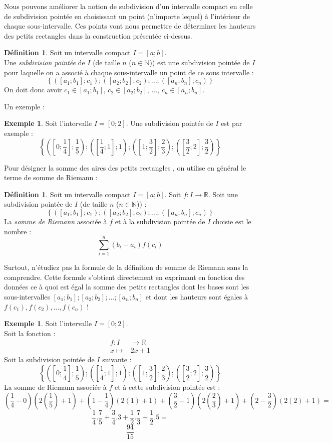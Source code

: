 \documentclass[a4paper,fontsize=13pt]{scrreprt}
\theoremstyle{plain}
\theoremstyle{definition}
\newtheorem{déf}[subsection]{Définition}
\newtheorem{exe}[subsection]{Exemple}
\newcommand{\nn}{\mathbb{N}}
\newcommand{\rr}{\mathbb{R}}
\begin{document}
Nous pouvons améliorer la notion de subdivision d'un intervalle compact en celle de subdivision pointée en choisissant un point (n'importe lequel) à l'intérieur de chaque sous-intervalle. Ces points vont nous permettre de déterminer les hauteurs des petits rectangles dans la construction présentée ci-dessus.
\begin{déf}
Soit un intervalle compact $I = [a;b]$. \\
Une \emph{subdivision pointée} de $I$ (de taille $n$ ($n \in \nn$)) est une subdivision pointée de $I$ pour laquelle on a associé à chaque sous-intervalle un point de ce sous intervalle :
$$\left\{([a_1;b_1];c_1);([a_2;b_2];c_2);...;([a_n;b_n];c_n)\right\}$$
On doit donc avoir $c_1 \in [a_1;b_1]$, $c_2 \in [a_2;b_2]$, ..., $c_n \in [a_n;b_n]$.
\end{déf}
Un exemple :
\begin{exe}
Soit l'intervalle $I = [0;2]$. Une subdivision pointée de $I$ est par exemple :
$$\left\{([0;\frac{1}{4}];\frac{1}{5});([\frac{1}{4};1];1);([1;\frac{3}{2}];\frac{2}{3});([\frac{3}{2};2];\frac{3}{2})\right\}$$
\end{exe}
Pour désigner \og la somme des aires des petits rectangles \fg, on utilise en général le terme de somme de Riemann :
\begin{déf}
Soit un intervalle compact $I = [a;b]$. Soit $f : I \to \rr$. Soit une subdivision pointée de $I$ (de taille $n$ ($n \in \nn$)) :
$$\left\{([a_1;b_1];c_1);([a_2;b_2];c_2);...;([a_n;b_n];c_n)\right\}$$
La \emph{somme de Riemann} associée à $f$ et à la subdivision pointée de $I$ choisie est le nombre :
$$\sum\limits_{i=1}^{n} (b_i - a_i) f(c_i)$$
\end{déf}
Surtout, n'étudiez pas la formule de la définition de somme de Riemann sans la comprendre. Cette formule s'obtient directement en exprimant en fonction des données ce à quoi est égal la somme des petits rectangles dont les bases sont les sous-intervalles $[a_1;b_1];[a_2;b_2];...;[a_n;b_n]$ et dont les hauteurs sont égales à $f(c_1), f(c_2),...,f(c_n)$ !
\begin{exe}
Soit l'intervalle $I = [0;2]$. \\
Soit la fonction :
\begin{align*}
f : I &\to \rr \\
x \mapsto & 2x+1
\end{align*}
Soit la subdivision pointée de $I$ suivante :
$$\left\{([0;\frac{1}{4}];\frac{1}{5});([\frac{1}{4};1];1);([1;\frac{3}{2}];\frac{2}{3});([\frac{3}{2};2];\frac{3}{2})\right\}$$
La somme de Riemann associée à $f$ et à cette subdivision pointée est :
$$(\frac{1}{4}-0)(2(\frac{1}{5})+1)+(1-\frac{1}{4})(2(1)+1) + (\frac{3}{2}-1)(2(\frac{2}{3})+1) + (2-\frac{3}{2})(2(2)+1)={}$$
$$\frac{1}{4}.\frac{7}{5}+\frac{3}{4}.3 + \frac{1}{2}.\frac{7}{3}+\frac{1}{2}.5 = {}$$
$$\frac{94}{15}$$
\end{exe}
\end{document}
